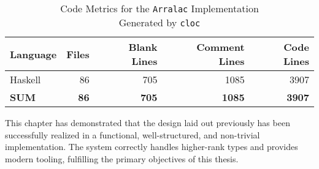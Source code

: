 \begin{table}[h!]
    \centering
    \footnotesize
    \caption{Code Metrics for the \texttt{Arralac} Implementation \\
        Generated by \texttt{cloc}}
    \begin{tabular}{lrrrr}
        \toprule
        \textbf{Language} & \textbf{Files} & \textbf{Blank Lines} & \textbf{Comment Lines} & \textbf{Code Lines} \\
        \midrule
        Haskell           & 86             & 705                  & 1085                   & 3907                \\
        \midrule
        \textbf{SUM}      & \textbf{86}    & \textbf{705}         & \textbf{1085}          & \textbf{3907}       \\
        \bottomrule
    \end{tabular}
    \label{table:cloc}
\end{table}

This chapter has demonstrated that the design laid out previously has been successfully realized in a functional, well-structured, and non-trivial implementation. The system correctly handles higher-rank types and provides modern tooling, fulfilling the primary objectives of this thesis.